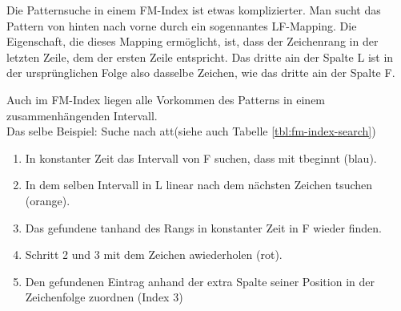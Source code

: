 Die Patternsuche in einem FM-Index ist etwas komplizierter.
Man sucht das Pattern von hinten nach vorne durch ein sogennantes LF-Mapping.
Die Eigenschaft, die dieses Mapping ermöglicht, ist, dass der Zeichenrang in der letzten Zeile, dem der ersten Zeile entspricht.
Das dritte \glqq a\grqq in der Spalte L ist in der ursprünglichen Folge also dasselbe Zeichen, wie das dritte \glqq a\grqq in der Spalte F.

Auch im FM-Index liegen alle Vorkommen des Patterns in einem zusammenhängenden Intervall.
\\
Das selbe Beispiel: Suche nach \glqq att\grqq (siehe auch Tabelle \ref{tbl:fm-index-search})
\begin{enumerate}
	\item In konstanter Zeit das Intervall von F suchen, dass mit \glqq t\grqq beginnt (blau).
	\item In dem selben Intervall in L linear nach dem nächsten Zeichen \glqq t\grqq suchen (orange).
	\item Das gefundene \glqq t\grqq anhand des Rangs in konstanter Zeit in F wieder finden.
	\item Schritt 2 und 3 mit dem Zeichen \glqq a\grqq wiederholen (rot).
	\item Den gefundenen Eintrag anhand der extra Spalte seiner Position in der Zeichenfolge zuordnen (Index 3)
\end{enumerate}

